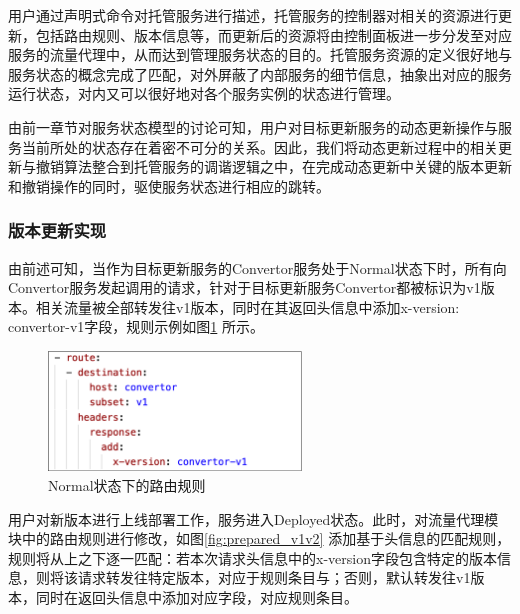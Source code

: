 \documentclass[macfonts,master]{njuthesis}
\begin{document}

用户通过声明式命令对托管服务进行描述，托管服务的控制器对相关的资源进行更新，包括路由规则、版本信息等，而更新后的资源将由控制面板进一步分发至对应服务的流量代理中，从而达到管理服务状态的目的。托管服务资源的定义很好地与服务状态的概念完成了匹配，对外屏蔽了内部服务的细节信息，抽象出对应的服务运行状态，对内又可以很好地对各个服务实例的状态进行管理。

由前一章节对服务状态模型的讨论可知，用户对目标更新服务的动态更新操作与服务当前所处的状态存在着密不可分的关系。因此，我们将动态更新过程中的相关更新与撤销算法整合到托管服务的调谐逻辑之中，在完成动态更新中关键的版本更新和撤销操作的同时，驱使服务状态进行相应的跳转。

\subsubsection{版本更新实现}
由前述可知，当作为目标更新服务的Convertor服务处于Normal状态下时，所有向Convertor服务发起调用的请求，针对于目标更新服务Convertor都被标识为v1版本。相关流量被全部转发往v1版本，同时在其返回头信息中添加x-version: convertor-v1字段，规则示例如图\ref{fig:route_v1} 所示。

\begin{figure}[!htbp]
  \centering
  \includegraphics[width= 0.6\textwidth]{image/route_v1.png}
  \caption{Normal状态下的路由规则}
  \label{fig:route_v1}
\end{figure}

用户对新版本进行上线部署工作，服务进入Deployed状态。此时，对流量代理模块中的路由规则进行修改，如图\ref{fig:prepared_v1v2} 添加基于头信息的匹配规则，规则将从上之下逐一匹配：若本次请求头信息中的x-version字段包含特定的版本信息，则将该请求转发往特定版本，对应于规则条目与；否则，默认转发往v1版本，同时在返回头信息中添加对应字段，对应规则条目。

\end{document}
